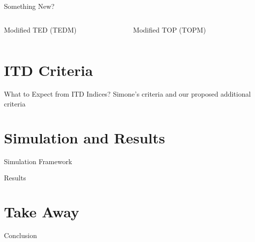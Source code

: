 \documentclass[a4paper,9pt]{beamer}\usepackage[]{graphicx}\usepackage[]{color}
\begin{document}
\begin{frame}{Something New?}

\begin{columns}
\begin{column}{0.5\textwidth}
\begin{block}{Modified TED (TEDM)}

\end{block}
\end{column}

\begin{column}{0.5\textwidth}
\begin{block}{Modified TOP (TOPM)}

\end{block}

\end{column}

\end{columns}
\end{frame}

\section{ITD Criteria}

\begin{frame}{What to Expect from ITD Indices?}
Simone's criteria and our proposed additional criteria

\end{frame}


\section{Simulation and Results}

\begin{frame}{Simulation Framework}


\end{frame}

\begin{frame}{Results}


\end{frame}

\section{Take Away}

\begin{frame}{Conclusion}


\end{frame}
\end{document}
